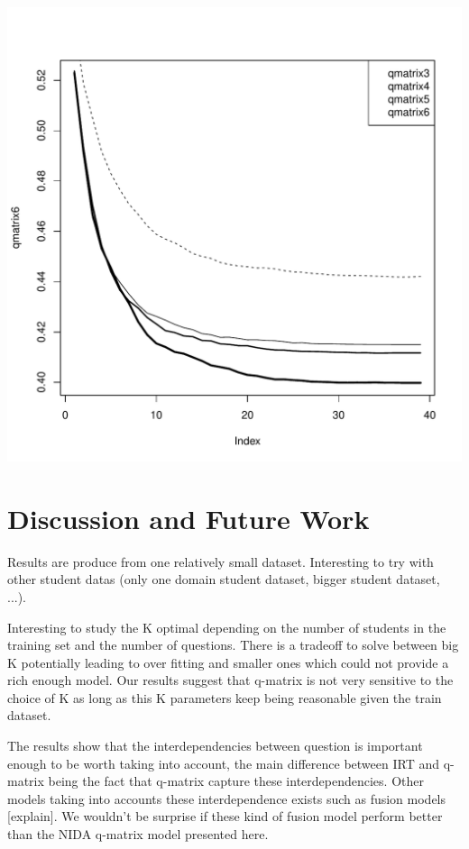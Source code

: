 \documentclass{sig-alternate}
\begin{document}
\includegraphics[width=\linewidth]{40-160.pdf}

\section{Discussion and Future Work}
Results are produce from one relatively small dataset. Interesting to try with other student datas (only one domain student dataset, bigger student dataset, ...). 

Interesting to study the K optimal depending on the number of students in the training set and the number of questions. There is a tradeoff to solve between big K potentially leading to over fitting and smaller ones which could not provide a rich enough model. Our results suggest that q-matrix is not very sensitive to the choice of K as long as this K parameters keep being reasonable given the train dataset. 

The results show that the interdependencies between question is important enough to be worth taking into account, the main difference between IRT and q-matrix being the fact that q-matrix capture these interdependencies. Other models taking into accounts these interdependence exists such as fusion models [explain]. We wouldn't be surprise if these kind of fusion model perform better than the NIDA q-matrix model presented here. 
\end{document}
